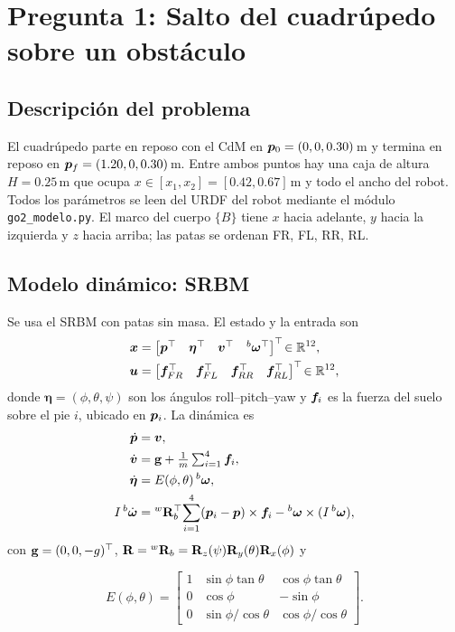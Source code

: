 \section{Pregunta 1: Salto del cuadrúpedo sobre un obstáculo}
\label{sec:p1}

\subsection{Descripción del problema}
El cuadrúpedo parte en reposo con el CdM en $\bm{p}_0=(0,0,0.30)$\,m y termina en reposo en $\bm{p}_f=(1.20,0,0.30)$\,m. Entre ambos puntos hay una caja de altura $H=0.25$\,m que ocupa $x\in[x_1,x_2]=[0.42,0.67]$\,m y todo el ancho del robot. Todos los parámetros se leen del URDF del robot mediante el módulo \texttt{go2\_modelo.py}. El marco del cuerpo $\{B\}$ tiene $x$ hacia adelante, $y$ hacia la izquierda y $z$ hacia arriba; las patas se ordenan FR, FL, RR, RL.

\subsection{Modelo dinámico: SRBM}
Se usa el SRBM con patas sin masa. El estado y la entrada son
\begin{align*}
    \bm{x}&=\begin{bmatrix}\bm{p}^{\top}&\bm{\eta}^{\top}&\bm{v}^{\top}&{}^b\bm{\omega}^{\top}\end{bmatrix}^{\top}\!\in\mathbb{R}^{12},\\
    \bm{u}&=\begin{bmatrix}\bm{f}_{FR}^{\top}&\bm{f}_{FL}^{\top}&\bm{f}_{RR}^{\top}&\bm{f}_{RL}^{\top}\end{bmatrix}^{\top}\!\in\mathbb{R}^{12},
\end{align*}
donde $\bm{\eta}=(\phi,\theta,\psi)$ son los ángulos roll--pitch--yaw y $\bm{f}_i$ es la fuerza del suelo sobre el pie $i$, ubicado en $\bm{p}_i$. La dinámica es
\begin{align*}
\dot{\bm{p}}&=\bm{v}, \\
\dot{\bm{v}}&=\mathbf{g}+\tfrac{1}{m}\textstyle\sum_{i=1}^{4}\bm{f}_i,\\
\dot{\bm{\eta}}&=E(\phi,\theta)\,{}^b\bm{\omega},\\
I\,{}^b\dot{\bm{\omega}}&={}^w\mathbf{R}_b^{\top}\!\sum_{i=1}^{4}(\bm{p}_i-\bm{p})\times\bm{f}_i-{}^b\bm{\omega}\times(I\,{}^b\bm{\omega}),
\end{align*}
con $\mathbf{g}=(0,0,-g)^{\top}$, $\mathbf{R}={}^w\mathbf{R}_b=\mathbf{R}_z(\psi)\mathbf{R}_y(\theta)\mathbf{R}_x(\phi)$ y

\begin{equation*}
E(\phi,\theta)=\begin{bmatrix}
1&\sin\phi\tan\theta&\cos\phi\tan\theta\\
0&\cos\phi&-\sin\phi\\
0&\sin\phi/\cos\theta&\cos\phi/\cos\theta
\end{bmatrix}.
\end{equation*}

